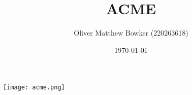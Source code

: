\documentclass{article}
\title{ACME}
\author{Oliver Matthew Bowker (220263618)}
\date{\today}
\begin{document}
  \maketitle
  \begin{center}
    \texttt{[image: acme.png]}
  \end{center}
  \newpage

  \tableofcontents
  \newpage

  \listoffigures
  \newpage

  \listoftables
  \newpage

  
  
  
  
  
  
  
  
\end{document}
